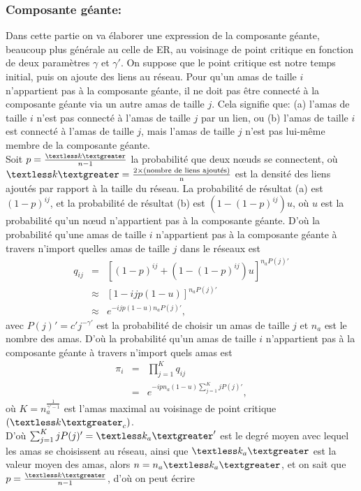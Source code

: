 \subsubsection{Composante géante:}
Dans cette partie on va élaborer une expression de la composante géante, beaucoup plus générale au celle de ER, au voisinage de point critique en fonction de deux paramètres $\gamma$ et $\gamma'$.
On suppose que le point critique est notre temps initial, puis on ajoute des liens au réseau.
Pour qu'un amas de taille $i$ n'appartient pas à la composante géante, il ne doit pas être connecté à la composante géante via un autre amas de taille $j$. Cela signifie que: (a) l'amas de taille $i$ n'est pas connecté à l'amas de taille $j$ par un lien, ou (b) l'amas  de taille $i$ est connecté à l'amas de taille $j$, mais l'amas de taille $j$ n'est pas lui-même membre de la composante géante.\\
Soit $p=\frac{\km}{n-1}$ la probabilité que deux nœuds se connectent, où
$\km=\frac{2\times\text{(nombre de liens ajoutés)}}{\text{n}}$ est la densité des liens ajoutés par rapport à la taille du réseau.
La probabilité de résultat (a) est $(1-p)^{ij}$, et la probabilité de résultat (b) est $(1-(1-p)^{ij})u$, où $u$ est la probabilité qu'un nœud n'appartient pas à la composante géante. D'où la probabilité qu'une amas de taille $i$ n'appartient pas à la composante géante à travers n'import quelles amas de taille $j$  dans le réseaux est
\begin{eqnarray}
q_{ij}&=&[(1-p)^{ij}+(1-(1-p)^{ij})u]^{n_aP(j)'}\nonumber\\
&\approx&[1-ijp(1-u)]^{n_aP(j)'}\nonumber\\
&\approx&e^{-ijp(1-u)n_aP(j)'},
\end{eqnarray}
 avec $P(j)'=c'j^{-\gamma'}$ est la probabilité de choisir un amas de taille $j$ et $n_a$ est le nombre des amas.
D'où la probabilité qu'un amas de taille $i$ n'appartient pas à la composante géante à travers n'import quels amas est
\begin{eqnarray}
\pi_{i}&=&\prod_{j=1}^{K}q_{ij}\nonumber\\
       &=&e^{-ipn_a(1-u)\sum_{j=1}^{K}jP(j)'},
\end{eqnarray}
où $K=n_a^{\frac{1}{\gamma'-1}}$ est l'amas maximal au voisinage de point critique $(\km_c)$.\\ D'où $\sum_{j=1}^{K}jP(j)'=\kma'$ est le degré moyen avec lequel les amas se choisissent au réseau, ainsi que $\kma$ est la valeur moyen des amas, alors $n=n_a\kma$, et on sait que $p=\frac{\km}{n-1}$, d'où on peut écrire
